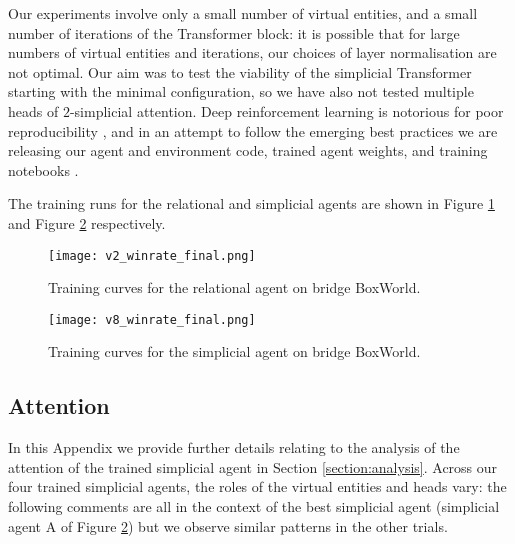 \documentclass{article} %
\begin{document}

Our experiments involve only a small number of virtual entities, and a small number of iterations of the Transformer block: it is possible that for large numbers of virtual entities and iterations, our choices of layer normalisation are not optimal. Our aim was to test the viability of the simplicial Transformer starting with the minimal configuration, so we have also not tested multiple heads of $2$-simplicial attention. Deep reinforcement learning is notorious for poor reproducibility \citep{henderson}, and in an attempt to follow the emerging best practices we are releasing our agent and environment code, trained agent weights, and training notebooks \citep{repo}.

The training runs for the relational and simplicial agents are shown in Figure \ref{figure:winrate_graph_v2} and Figure \ref{figure:winrate_graph_v8} respectively.  
\begin{figure}[h]
\begin{center}
\texttt{[image: v2\_winrate\_final.png]}
\end{center}
\caption{Training curves for the relational agent on bridge BoxWorld.}
\label{figure:winrate_graph_v2}
\end{figure}

\begin{figure}[h]
\begin{center}
\texttt{[image: v8\_winrate\_final.png]}
\end{center}
\caption{Training curves for the simplicial agent on bridge BoxWorld.}
\label{figure:winrate_graph_v8}
\end{figure} 


\subsection{Attention}

In this Appendix we provide further details relating to the analysis of the attention of the trained simplicial agent in Section \ref{section:analysis}. Across our four trained simplicial agents, the roles of the virtual entities and heads vary: the following comments are all in the context of the best simplicial agent (simplicial agent A of Figure \ref{figure:winrate_graph_v8}) but we observe similar patterns in the other trials.
\end{document}

